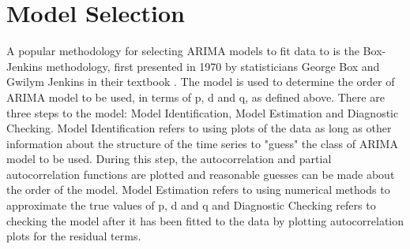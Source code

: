 \section{Model Selection}
A popular methodology for selecting ARIMA models to fit data to is the Box-Jenkins methodology, first presented in 1970 by statisticians George Box and Gwilym Jenkins in their textbook . The model is used to determine the order of ARIMA model to be used, in terms of p, d and q, as defined above. There are three steps to the model: Model Identification, Model Estimation and Diagnostic Checking. Model Identification refers to using plots of the data as long as other information about the structure of the time series to "guess" the class of ARIMA model to be used. During this step, the autocorrelation and partial autocorrelation functions are plotted and reasonable guesses can be made about the order of the model. Model Estimation refers to using numerical methods to approximate the true values of p, d and q and Diagnostic Checking refers to checking the model after it has been fitted to the data by plotting autocorrelation plots for the residual terms.